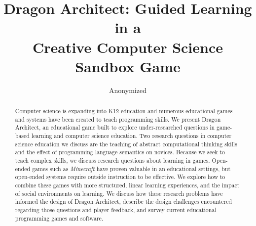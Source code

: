 \documentclass{sig-alternate}
\newcommand{\gametitle}{{Dragon Architect}}
\begin{document}
%

\title{Dragon Architect: Guided Learning in a \\Creative Computer Science Sandbox Game}

\author{Anonymized}


\maketitle
\begin{abstract}
Computer science is expanding into K12 education and numerous educational games and systems have been created to teach programming skills. We present \gametitle{}, an educational game built to explore under-researched questions in game-based learning and computer science education. Two research questions in computer science education we discuss are the teaching of abstract computational thinking skills and the effect of programming language semantics on novices. Because we seek to teach complex skills, we discuss research questions about learning in games. Open-ended games such as \emph{Minecraft} have proven valuable in an educational settings, but open-ended systems require outside instruction to be effective. We explore how to combine these games with more structured, linear learning experiences, and the impact of social environments on learning. We discuss how these research problems have informed the design of \gametitle{}, describe the design challenges encountered regarding those questions and player feedback, and survey current educational programming games and software.
\end{abstract}
\end{document}
